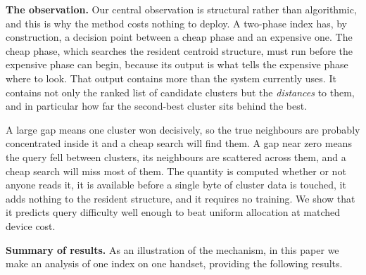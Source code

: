 \documentclass[journal]{IEEEtran}
\begin{document}
\textbf{The observation.} Our central observation is structural rather than
algorithmic, and this is why the method costs nothing to deploy. A
two-phase index has, by construction, a decision point between a cheap
phase and an expensive one. The cheap phase, which searches the resident
centroid structure, must run before the expensive phase can begin, because
its output is what tells the expensive phase where to look. That output
contains more than the system currently uses. It contains not only the
ranked list of candidate clusters but the \emph{distances} to them, and in
particular how far the second-best cluster sits behind the best.

A large gap means one cluster won decisively, so the true neighbours are
probably concentrated inside it and a cheap search will find them. A gap
near zero means the query fell between clusters, its neighbours are
scattered across them, and a cheap search will miss most of them. The
quantity is computed whether or not anyone reads it, it is available before
a single byte of cluster data is touched, it adds nothing to the resident
structure, and it requires no training. We show that it predicts query
difficulty well enough to beat uniform allocation at matched device cost.

\textbf{Summary of results.} As an illustration of the mechanism, in this
paper we make an analysis of one index on one handset, providing the
following results.
\end{document}
